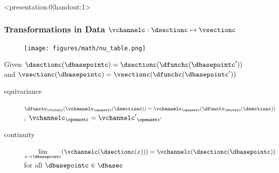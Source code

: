 \documentclass[xcolor={dvipsnames}]{beamer}
\begin{document}
\begin{frame}<presentation:0|handout:1>
    \frametitle{Transformations in Data $\vchannelc: \dsectionc \mapsto \vsectionc$}
    \begin{figure}
        \texttt{[image: figures/math/nu\_table.png]}
    \end{figure}
    Given $\dsectionc(\dbasepointc) = \dsectionc(\dfunchc(\dbasepointc^{\prime}))$ and  $\vsectionc(\dbasepointc) = \vsectionc(\dfunchc(\dbasepointc^{\prime}))$
    \begin{description}
        \item[equivariance] $\dfunctc_{\vtotalc}(\vchannelc_{\opensetc}(\dsectionc))
        = \vchannelc_{\opensetc}(\dfunctc_{\dtotalc}(\dsectionc))$, $\vchannelc_{\opensetc} = {\vchannelc^{\prime}}_{\opensetc^{\prime}}$
        \item[continuity] $\lim\limits_{x\to \dbasepointc}(\vchannelc(\dsectionc(x))) = \vchannelc(\dsectionc(\dbasepointc))$ for all $\dbasepointc \in \dbasec$ 
    \end{description}
\end{frame}  
\end{document}
